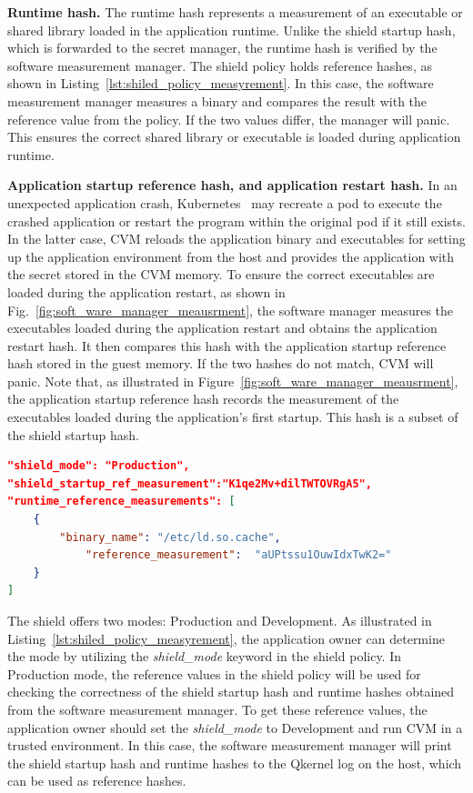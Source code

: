 \textbf{Runtime hash.} The runtime hash represents a measurement of an executable or shared library loaded in the application runtime. Unlike the shield startup hash, which is forwarded to the secret manager, the runtime hash is verified by the software measurement manager. The shield policy holds reference hashes, as shown in 
Listing~\ref{lst:shiled_policy_measyrement}. In this case, the software measurement manager measures a binary and compares the result with the reference value from the policy. If the two values differ, the manager will panic. This ensures the correct shared library or executable is loaded during application runtime.



\textbf{Application startup reference hash, and application restart hash.} In an unexpected application crash, Kubernetes~\cite*{k8s} may recreate a pod to execute the crashed application or restart the program within the original pod if it still exists. In the latter case, \acrshort{CVM} reloads the application binary and executables for setting up 
the application environment from the host and provides the application with the secret stored in the \acrshort{CVM} memory. To ensure the correct executables are loaded during the application restart,  as shown in Fig.~\ref{fig:soft_ware_manager_meausrment}, the software manager measures the executables loaded during the application restart and obtains 
the application restart hash. It then compares this hash with the application startup reference hash stored in the guest memory. If the two hashes do not match, \acrshort{CVM} will panic. Note that, as illustrated in Figure~\ref{fig:soft_ware_manager_meausrment}, the application startup reference hash records the measurement of the executables loaded during the 
application's first startup. This hash is a subset of the shield startup hash.

\begin{lstlisting}[language=json, caption= Software measurement manager's configuration in the shield policy, label={lst:shiled_policy_measyrement}]
"shield_mode": "Production",
"shield_startup_ref_measurement":"K1qe2Mv+dilTWTOVRgA5",
"runtime_reference_measurements": [
    {
        "binary_name": "/etc/ld.so.cache",
            "reference_measurement":  "aUPtssu1OuwIdxTwK2="
    }   
]
\end{lstlisting}

The shield offers two modes: Production and Development. As illustrated in Listing~\ref{lst:shiled_policy_measyrement}, the application owner can determine the mode by utilizing the \emph{shield\_mode} keyword in the shield policy. In Production mode, the reference values in the shield policy will be used for checking the correctness 
of the shield startup hash and runtime hashes obtained from the software measurement manager. To get these reference values, the application owner should set the \emph{shield\_mode} to Development and run \acrshort{CVM} in a trusted environment. 
In this case, the software measurement manager will print the shield startup hash and runtime hashes to the Qkernel log on the host, which can be used as reference hashes.



